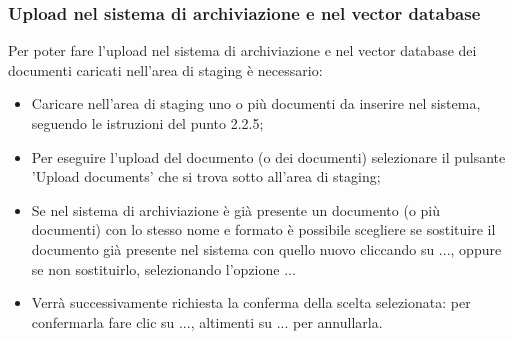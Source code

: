 \documentclass[10pt, a4paper]{article}
\begin{document}
\subsubsection{Upload nel sistema di archiviazione e nel vector database}
Per poter fare l’upload nel sistema di archiviazione e nel vector database dei documenti caricati nell’area di staging è necessario:
\begin{itemize}
    \item Caricare nell'area di staging uno o più documenti da inserire nel sistema, seguendo le istruzioni del punto 2.2.5; 
    \item Per eseguire l'upload del documento (o dei documenti) selezionare il pulsante 'Upload documents' che si trova sotto all'area di staging;
    \item Se nel sistema di archiviazione è già presente un documento (o più documenti) con lo stesso nome e formato è possibile scegliere se sostituire il documento già presente nel sistema con quello nuovo cliccando su ..., oppure se non sostituirlo, selezionando l'opzione ... 
    \item  Verrà successivamente richiesta la conferma della scelta selezionata: per confermarla fare clic su ..., altimenti su ... per annullarla.
    
\end{itemize}
\end{document}
